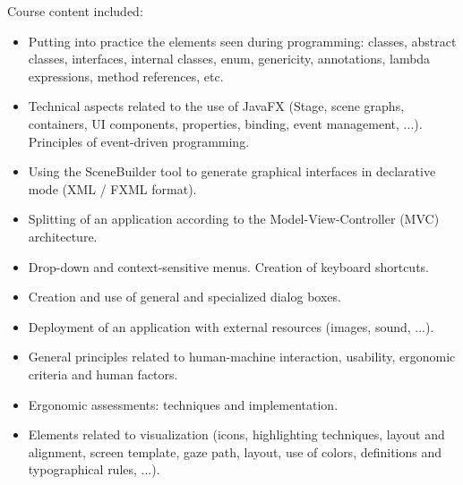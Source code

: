 Course content included:
\begin{itemize}
    \item Putting into practice the elements seen during programming: classes, abstract classes, interfaces, internal classes, enum, genericity, annotations, lambda expressions, method references, etc.
    \item Technical aspects related to the use of JavaFX (Stage, scene graphs, containers, UI components, properties, binding, event management, ...). Principles of event-driven programming.
    \item Using the SceneBuilder tool to generate graphical interfaces in declarative mode (XML / FXML format).
    \item Splitting of an application according to the Model-View-Controller (MVC) architecture.
    \item Drop-down and context-sensitive menus. Creation of keyboard shortcuts.
    \item Creation and use of general and specialized dialog boxes.
    \item Deployment of an application with external resources (images, sound, ...).
    \item General principles related to human-machine interaction, usability, ergonomic criteria and human factors.
    \item Ergonomic assessments: techniques and implementation.
    \item Elements related to visualization (icons, highlighting techniques, layout and alignment, screen template, gaze path, layout, use of colors, definitions and typographical rules, ...).
\end{itemize}